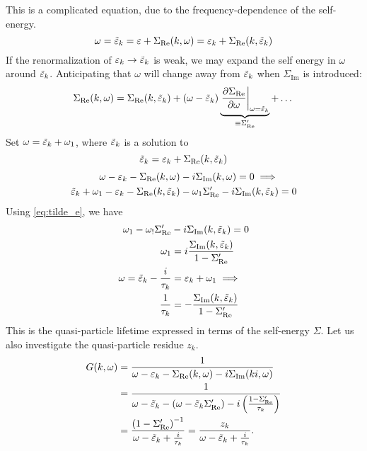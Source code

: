 This is a complicated equation, due to the frequency-dependence of the self-energy. 
\begin{equation} 
\omega = \tilde{\varepsilon}_k = \varepsilon + \Sigma_{\text{Re}}(k, \omega)  = \varepsilon_k + \Sigma_{\text{Re}}(k, \tilde{\varepsilon}_k)
\end{equation}
If the renormalization of $\varepsilon_k \rightarrow \tilde{\varepsilon}_k$ is weak, we may expand the self energy in $\omega$ around $\tilde{\varepsilon}_k$. Anticipating that $\omega$ will change away from $\tilde{\varepsilon}_k$ when $\Sigma_{\text{Im}}$ is introduced:
\begin{equation} 
\Sigma_{\text{Re}}(k,\omega) = \Sigma_{\text{Re}}(k,\tilde{\varepsilon}_k) + (\omega-\tilde{\varepsilon}_k)\underbrace{\left.\pdv{\Sigma_{\text{Re}}}{\omega}\right|_{\omega =  \tilde{\varepsilon}_k}}_{\equiv \Sigma_{\text{Re}}'} + \dots
\end{equation}
Set $\omega = \tilde{\varepsilon}_k + \omega_1$, where $\tilde{\varepsilon}_k$ is a solution to 
\begin{equation}
\label{eq:tilde_e} 
\tilde{\varepsilon}_k = \varepsilon_k + \Sigma_{\text{Re}}(k, \tilde{\varepsilon}_k)
\end{equation}
\begin{align*} 
\omega-  \varepsilon_k - \Sigma_{\text{Re}}(k, \omega) &- i\Sigma_{\text{Im}}(k, \omega) = 0 \implies \\
\tilde{\varepsilon}_k + \omega_1 - \varepsilon_k - \Sigma_{\text{Re}}(k, \tilde{\varepsilon}_k) & - \omega_1\Sigma_{\text{Re}}' - i\Sigma_{\text{Im}}(k, \tilde{\varepsilon}_k) = 0
\end{align*}
Using \cref{eq:tilde_e}, we have
\begin{align*} 
\omega_1 - \omega_!\Sigma_{\text{Re}}' &- i\Sigma_{\text{Im}}(k, \tilde{\varepsilon}_k) = 0 \\
\omega_1 &= i\frac{\Sigma_{\text{Im}}(k, \tilde{\varepsilon}_k)}{1-\Sigma_{\text{Re}}'} \\
\omega = \tilde{\varepsilon}_k-\frac{i}{\tau_k} &= \varepsilon_k + \omega_1 \implies \\
\frac{1}{\tau_k} &= -\frac{\Sigma_{\text{Im}}(k, \tilde{\varepsilon}_k)}{1-\Sigma_{\text{Re}}'}
\end{align*}
This is the quasi-particle lifetime expressed in terms of the self-energy $\Sigma$.
Let us also investigate the quasi-particle residue $z_k$.
\begin{align*} 
G(k, \omega) &= \frac{1}{\omega-\varepsilon_k-\Sigma_{\text{Re}}(k, \omega) - i\Sigma_{\text{Im}}(ki, \omega)} \\
&= \frac{1}{\omega-\tilde{\varepsilon}_k -(\omega-\tilde{\varepsilon}_k\Sigma_{\text{Re}}') -i\left(\frac{1-\Sigma_{\text{Re}}'}{\tau_k}\right)} \\
&= \frac{\left(1-\Sigma_{\text{Re}}'\right)^{-1}}{\omega-\tilde{\varepsilon}_k + \frac{i}{\tau_k}} = \frac{z_k}{\omega - \tilde{\varepsilon}_k + \frac{i}{\tau_k}}.
\end{align*}

